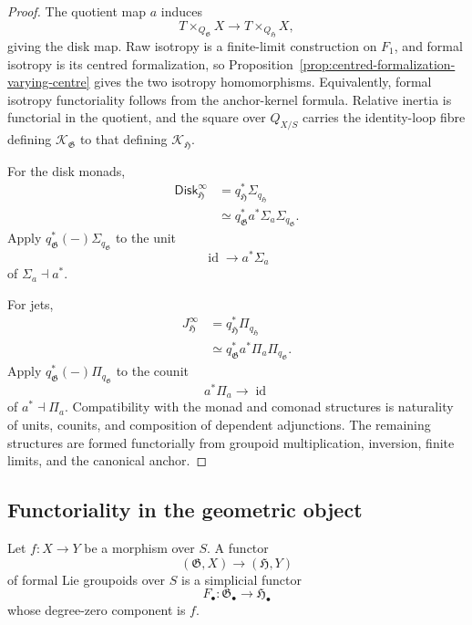\begin{proof}
The quotient map $a$ induces
\[
    T\times_{Q_{\mathfrak G}}X
    \longrightarrow
    T\times_{Q_{\mathfrak H}}X,
\]
giving the disk map.  Raw isotropy is a finite-limit construction on
$F_1$, and formal isotropy is its centred formalization, so
Proposition~\ref{prop:centred-formalization-varying-centre} gives the two
isotropy homomorphisms.  Equivalently, formal isotropy functoriality follows
from the anchor-kernel formula.  Relative inertia is functorial in the
quotient, and the square over $Q_{X/S}$ carries the identity-loop fibre
defining $\mathcal K_{\mathfrak G}$ to that defining
$\mathcal K_{\mathfrak H}$.

For the disk monads,
\[
\begin{aligned}
    \mathsf{Disk}^{\infty}_{\mathfrak H}
    &=
    q_{\mathfrak H}^*\Sigma_{q_{\mathfrak H}}\\
    &\simeq
    q_{\mathfrak G}^*a^*\Sigma_a\Sigma_{q_{\mathfrak G}}.
\end{aligned}
\]
Apply
$q_{\mathfrak G}^*(-)\Sigma_{q_{\mathfrak G}}$
to the unit
\[
    \operatorname{id}\longrightarrow a^*\Sigma_a
\]
of $\Sigma_a\dashv a^*$.

For jets,
\[
\begin{aligned}
    J^\infty_{\mathfrak H}
    &=
    q_{\mathfrak H}^*\Pi_{q_{\mathfrak H}}\\
    &\simeq
    q_{\mathfrak G}^*a^*\Pi_a\Pi_{q_{\mathfrak G}}.
\end{aligned}
\]
Apply
$q_{\mathfrak G}^*(-)\Pi_{q_{\mathfrak G}}$
to the counit
\[
    a^*\Pi_a\longrightarrow\operatorname{id}
\]
of $a^*\dashv\Pi_a$.  Compatibility with the monad and comonad structures
is naturality of units, counits, and composition of dependent adjunctions.
The remaining structures are formed functorially from groupoid
multiplication, inversion, finite limits, and the canonical anchor.
\end{proof}

\subsection{Functoriality in the geometric object}

\begin{definition}
\label{def:functor-formal-lie-groupoids}
Let $f:X\to Y$ be a morphism over $S$.  A functor
\[
    (\mathfrak G,X)\longrightarrow(\mathfrak H,Y)
\]
of formal Lie groupoids over $S$ is a simplicial functor
\[
    F_\bullet:
    \mathfrak G_\bullet\longrightarrow\mathfrak H_\bullet
\]
whose degree-zero component is $f$.
\end{definition}

